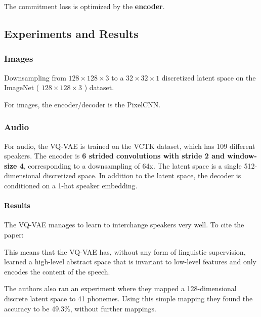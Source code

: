 The commitment loss is optimized by the \textbf{encoder}.



\subsection{Experiments and Results}

\subsubsection{Images}
Downsampling from \(128 \times 128 \times 3 \) to a \( 32 \times 32 \times 1 \) discretized latent space on the ImageNet ( \(128 \times 128 \times 3\) ) dataset.

For images, the encoder/decoder is the PixelCNN. 



\subsubsection{Audio}
For audio, the VQ-VAE is trained on the VCTK dataset, which has 109 different speakers. 
The encoder is \textbf{6 strided convolutions with stride 2 and window-size 4}, corresponding to a downsampling of 64x. 
The latent space is a single 512-dimensional discretized space. 
In addition to the latent space, the decoder is conditioned on a 1-hot speaker embedding. 

\paragraph{Results}
The VQ-VAE manages to learn to interchange speakers very well. To cite the paper:

\begin{displayquote}
    This means that the VQ-VAE has, without any form of linguistic supervision, 
    learned a high-level abstract space that is invariant to low-level features and only encodes the content of the speech.
\end{displayquote}


The authors also ran an experiment where they mapped a 128-dimensional discrete latent space to 41 phonemes. 
Using this simple mapping they found the accuracy to be \(49.3\%\), without further mappings. 

